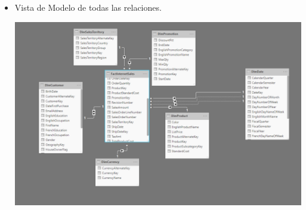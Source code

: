 \begin{itemize}
	\item Vista de Modelo de todas las relaciones.
	\begin{center}
	\includegraphics[width=13cm]{./Imagenes/Captura6} 
	\end{center}
\end{itemize} 

